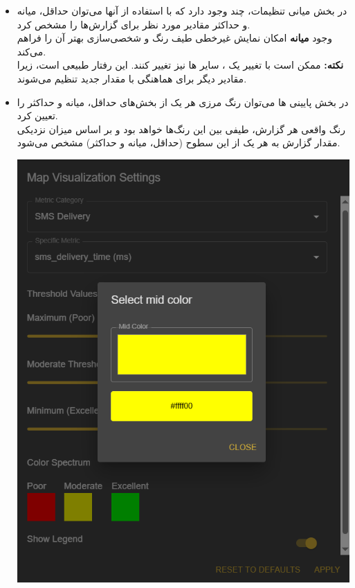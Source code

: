 \begin{itemize}
\begin{center}
    \end{center}

    \item در بخش میانی تنظیمات، چند  وجود دارد که با استفاده از آنها می‌توان حداقل، میانه و حداکثر مقادیر مورد نظر برای گزارش‌ها را مشخص کرد.\\
    وجود \textbf{میانه} امکان نمایش غیرخطی طیف رنگ و شخصی‌سازی بهتر آن را فراهم می‌کند.\\
    \textbf{نکته:} ممکن است با تغییر یک ، سایر ‌ها نیز تغییر کنند. این رفتار طبیعی است، زیرا مقادیر دیگر برای هماهنگی با مقدار جدید تنظیم می‌شوند.

    \item در بخش پایینی ها می‌توان رنگ مرزی هر یک از بخش‌های حداقل، میانه و حداکثر را تعیین کرد.\\
    رنگ واقعی هر گزارش، طیفی بین این رنگ‌ها خواهد بود و بر اساس میزان نزدیکی مقدار گزارش به هر یک از این سطوح (حداقل، میانه و حداکثر) مشخص می‌شود.
    \begin{center}
        \includegraphics[width=\textwidth]{images/settings_color_picker.png}
    \end{center}


\end{itemize}
